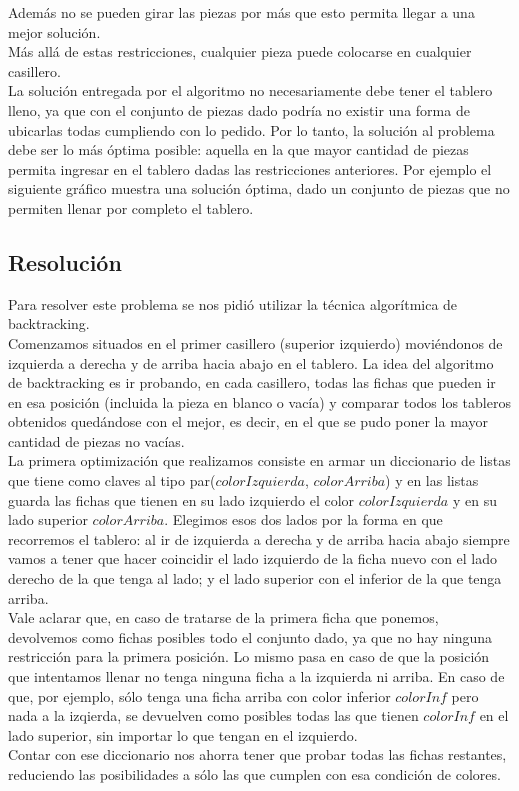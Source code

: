 Adem\'as no se pueden girar las piezas por más que esto permita llegar a una mejor soluci\'on.\\
M\'as all\'a de estas restricciones, cualquier pieza puede colocarse en cualquier casillero.\\
La soluci\'on entregada por el algoritmo no necesariamente debe tener el tablero lleno, ya que con el conjunto de piezas dado podr\'ia no existir una forma de ubicarlas todas cumpliendo con lo pedido. Por lo tanto, la soluci\'on al problema debe ser lo m\'as \'optima posible: aquella en la que mayor cantidad de piezas permita ingresar en el tablero dadas las restricciones anteriores.
Por ejemplo el siguiente gr\'afico muestra una soluci\'on \'optima, dado un conjunto de piezas que no permiten llenar por completo el tablero.

\subsection{Resoluci\'on}

Para resolver este problema se nos pidi\'o utilizar la t\'ecnica algor\'itmica de backtracking.\\ 
Comenzamos situados en el primer casillero (superior izquierdo) movi\'endonos de izquierda a derecha y de arriba hacia abajo en el tablero. La idea del algoritmo de backtracking es ir probando, en cada casillero, todas las fichas que pueden ir en esa posici\'on (incluida la pieza en blanco o vac\'ia) y comparar todos los tableros obtenidos qued\'andose con el mejor, es decir, en el que se pudo poner la mayor cantidad de piezas no vac\'ias. \\

La primera optimizaci\'on que realizamos consiste en armar un diccionario de listas que tiene como claves al tipo par($colorIzquierda$, $colorArriba$) y en las listas guarda las fichas que tienen en su lado izquierdo el color $colorIzquierda$ y en su lado superior $colorArriba$. Elegimos esos dos lados por la forma en que recorremos el tablero: al ir de izquierda a derecha y de arriba hacia abajo siempre vamos a tener que hacer coincidir el lado izquierdo de la ficha nuevo con el lado derecho de la que tenga al lado; y el lado superior con el inferior de la que tenga arriba.\\
Vale aclarar que, en caso de tratarse de la primera ficha que ponemos, devolvemos como fichas posibles todo el conjunto dado, ya que no hay ninguna restricci\'on para la primera posici\'on. Lo mismo pasa en caso de que la posici\'on que intentamos llenar no tenga ninguna ficha a la izquierda ni arriba. En caso de que, por ejemplo, s\'olo tenga una ficha arriba con color inferior $colorInf$ pero nada a la izqierda, se devuelven como posibles todas las que tienen $colorInf$ en el lado superior, sin importar lo que tengan en el izquierdo.\\
Contar con ese diccionario nos ahorra tener que probar todas las fichas restantes, reduciendo las posibilidades a s\'olo las que cumplen con esa condici\'on de colores.\\

